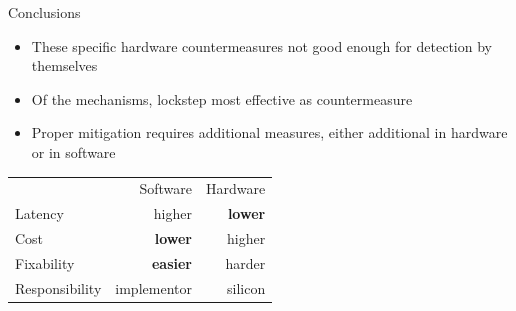 \documentclass[table]{beamer}
\begin{document}
\begin{frame}{Conclusions}
    \begin{itemize}
        \item These specific hardware countermeasures not  good enough for detection by themselves
        \item Of the mechanisms, lockstep most effective as countermeasure
        \item Proper mitigation requires additional measures, either additional in hardware or in software
    \end{itemize}

    \begin{table}[H]
        \centering
        \begin{tabular}{l r r}
        \toprule
        \cellcolor{white!100} & Software & Hardware \\
        \cmidrule{1-3}
        Latency         & higher           & \textbf{lower} \\
        Cost            & \textbf{lower}   & higher \\
        Fixability      & \textbf{easier}  & harder \\
        Responsibility   & implementor& silicon          \\
        \bottomrule
        \end{tabular}
  \end{table}

\end{frame}

\end{document}
